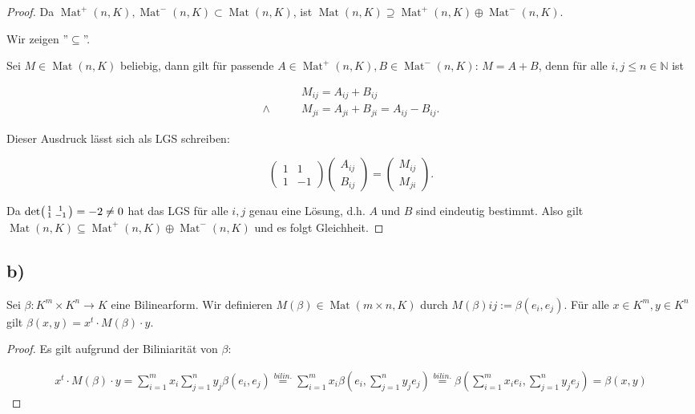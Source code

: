 \documentclass{article}
\newcommand{\NN}{\mathbb{N}}
\DeclareMathOperator{\Mat}{Mat}
\begin{document}
\begin{proof}
    Da $\Mat^+(n, K), \Mat^-(n, K) \subset \Mat(n,K)$,
    ist $\Mat(n,K) \supseteq \Mat^+(n, K) \oplus \Mat^-(n, K)$.

    Wir zeigen ''$\subseteq$''.

    Sei $M \in \Mat(n,K)$ beliebig, dann gilt für passende
    $A \in \Mat^+(n,K), B \in \Mat^-(n,K)$:
    $M = A+B$, denn für alle
    $i,j \leq n \in \NN$ ist

    \[
    \begin{aligned}
        & M_{ij} = A_{ij} + B_{ij} \\
        \land\qquad
        & M_{ji} = A_{ji} + B_{ji} = A_{ij} - B_{ij}.
    \end{aligned}
    \]

    Dieser Ausdruck lässt sich als LGS schreiben:

    \[
    \begin{pmatrix}
        1 & 1 \\
        1 & -1
    \end{pmatrix}
    \begin{pmatrix}
        A_{ij} \\
        B_{ij}
    \end{pmatrix}
    =
    \begin{pmatrix}
        M_{ij} \\
        M_{ji}
    \end{pmatrix}.
    \]

    Da $\det\begin{psmallmatrix}
        1 & 1 \\
        1 & -1
    \end{psmallmatrix} = -2 \neq 0$
    hat das LGS für alle $i,j$ genau eine Lösung,
    d.h. $A$ und $B$ sind eindeutig bestimmt.
    Also gilt $\Mat(n,K) \subseteq \Mat^+(n, K) \oplus \Mat^-(n, K)$
    und es folgt Gleichheit.
\end{proof}

\subsection*{b)}

Sei $\beta : K^m \times K^n \to K$ eine Bilinearform. Wir definieren
$M(\beta) \in \Mat(m \times n, K )$ durch $M(\beta)i j := \beta(e_i , e_j )$.
Für alle $x \in K^m , y \in K^n$ gilt $\beta(x, y) = x^t \cdot M(\beta) \cdot y$.

\begin{proof}
    Es gilt aufgrund der Biliniarität von $\beta$:

    \[
    \begin{aligned}
        x^t \cdot M(\beta) \cdot y
        =
        \sum_{i=1}^{m} x_i \sum_{j=1}^{n} y_j \beta(e_i,e_j)
        \overset{bilin.}{=}
        \sum_{i=1}^{m} x_i \beta(e_i,\sum_{j=1}^{n} y_j e_j)
        \overset{bilin.}{=}
        \beta(\sum_{i=1}^{m} x_i e_i,\sum_{j=1}^{n} y_j e_j)
        =
        \beta(x, y)
    \end{aligned}
    \]
\end{proof}
\end{document}
